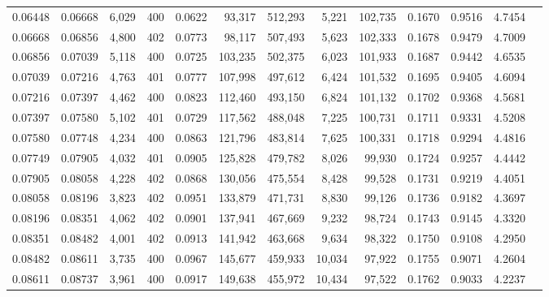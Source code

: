 \begin{tabular}{rrrrrrrrrrrrr}
0.06448 & 0.06668 &  6,029 & 400 &                                     0.0622 &  93,317 & 512,293 &   5,221 & 102,735 & 0.1670 & 0.9516 & 4.7454 \\
0.06668 & 0.06856 &  4,800 & 402 &                                     0.0773 &  98,117 & 507,493 &   5,623 & 102,333 & 0.1678 & 0.9479 & 4.7009 \\
0.06856 & 0.07039 &  5,118 & 400 &                                     0.0725 & 103,235 & 502,375 &   6,023 & 101,933 & 0.1687 & 0.9442 & 4.6535 \\
0.07039 & 0.07216 &  4,763 & 401 &                                     0.0777 & 107,998 & 497,612 &   6,424 & 101,532 & 0.1695 & 0.9405 & 4.6094 \\
0.07216 & 0.07397 &  4,462 & 400 &                                     0.0823 & 112,460 & 493,150 &   6,824 & 101,132 & 0.1702 & 0.9368 & 4.5681 \\
0.07397 & 0.07580 &  5,102 & 401 &                                     0.0729 & 117,562 & 488,048 &   7,225 & 100,731 & 0.1711 & 0.9331 & 4.5208 \\
0.07580 & 0.07748 &  4,234 & 400 &                                     0.0863 & 121,796 & 483,814 &   7,625 & 100,331 & 0.1718 & 0.9294 & 4.4816 \\
0.07749 & 0.07905 &  4,032 & 401 &                                     0.0905 & 125,828 & 479,782 &   8,026 &  99,930 & 0.1724 & 0.9257 & 4.4442 \\
0.07905 & 0.08058 &  4,228 & 402 &                                     0.0868 & 130,056 & 475,554 &   8,428 &  99,528 & 0.1731 & 0.9219 & 4.4051 \\
0.08058 & 0.08196 &  3,823 & 402 &                                     0.0951 & 133,879 & 471,731 &   8,830 &  99,126 & 0.1736 & 0.9182 & 4.3697 \\
0.08196 & 0.08351 &  4,062 & 402 &                                     0.0901 & 137,941 & 467,669 &   9,232 &  98,724 & 0.1743 & 0.9145 & 4.3320 \\
0.08351 & 0.08482 &  4,001 & 402 &                                     0.0913 & 141,942 & 463,668 &   9,634 &  98,322 & 0.1750 & 0.9108 & 4.2950 \\
0.08482 & 0.08611 &  3,735 & 400 &                                     0.0967 & 145,677 & 459,933 &  10,034 &  97,922 & 0.1755 & 0.9071 & 4.2604 \\
0.08611 & 0.08737 &  3,961 & 400 &                                     0.0917 & 149,638 & 455,972 &  10,434 &  97,522 & 0.1762 & 0.9033 & 4.2237 \\

\end{tabular}
